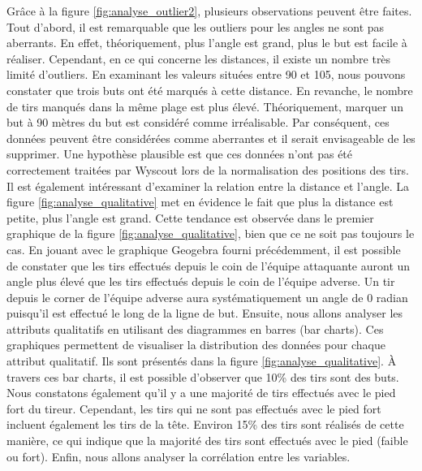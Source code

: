 \documentclass[12pt]{article}
\begin{document}
Grâce à la figure \ref{fig:analyse_outlier2}, plusieurs observations peuvent être faites.
Tout d'abord, il est remarquable que les outliers pour les angles ne sont pas aberrants.
En effet, théoriquement, plus l'angle est grand, plus le but est facile à réaliser.
Cependant, en ce qui concerne les distances, il existe un nombre très limité d'outliers.
En examinant les valeurs situées entre 90 et 105, nous pouvons constater que trois buts ont été marqués à cette distance.
En revanche, le nombre de tirs manqués dans la même plage est plus élevé.
Théoriquement, marquer un but à 90 mètres du but est considéré comme irréalisable.
Par conséquent, ces données peuvent être considérées comme aberrantes et il serait envisageable de les supprimer.
Une hypothèse plausible est que ces données n'ont pas été correctement traitées par Wyscout lors de la normalisation des positions des tirs.
\newline\newline
Il est également intéressant d'examiner la relation entre la distance et l'angle.
La figure \ref{fig:analyse_qualitative} met en évidence le fait que plus la distance est petite, plus l'angle est grand.
Cette tendance est observée dans le premier graphique de la figure \ref{fig:analyse_qualitative}, bien que ce ne soit pas toujours le cas.
En jouant avec le graphique Geogebra fourni précédemment, il est possible de constater que les tirs effectués depuis le coin de l'équipe attaquante auront un angle plus élevé que les tirs effectués depuis le coin de l'équipe adverse.
Un tir depuis le corner de l'équipe adverse aura systématiquement un angle de 0 radian puisqu'il est effectué le long de la ligne de but.
\newline\newline
Ensuite, nous allons analyser les attributs qualitatifs en utilisant des diagrammes en barres (bar charts).
Ces graphiques permettent de visualiser la distribution des données pour chaque attribut qualitatif.
Ils sont présentés dans la figure \ref{fig:analyse_qualitative}.
À travers ces bar charts, il est possible d'observer que 10\% des tirs sont des buts.
Nous constatons également qu'il y a une majorité de tirs effectués avec le pied fort du tireur.
Cependant, les tirs qui ne sont pas effectués avec le pied fort incluent également les tirs de la tête.
Environ 15\% des tirs sont réalisés de cette manière, ce qui indique que la majorité des tirs sont effectués avec le pied (faible ou fort).
\newline\newline
Enfin, nous allons analyser la corrélation entre les variables.
\end{document}
